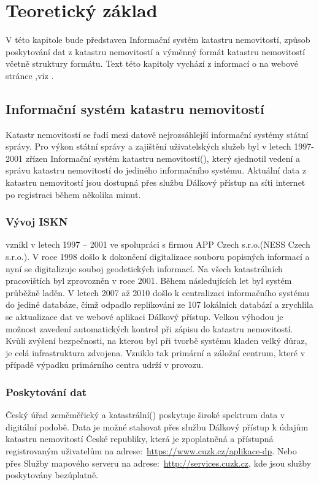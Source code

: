 \chapter{Teoretický základ}
\label{2-teorie}

V této kapitole bude představen Informační systém katastru
nemovitostí, způsob poskytování dat z katastru nemovitostí a výměnný
formát katastru nemovitostí včetně struktury formátu. Text této
kapitoly vychází z informací o  na webové stránce
,viz \cite{iskn}.

\section{Informační systém katastru nemovitostí}
Katastr nemovitostí se řadí mezi datově nejrozsáhlejší informační
systémy státní správy. Pro výkon státní správy a zajištění
uživatelských služeb byl v letech 1997-2001 zřízen Informační systém
katastru nemovitostí(), který sjednotil vedení a správu
katastru nemovitostí do jediného informačního systému. Aktuální data z
katastru nemovitostí jsou dostupná přes službu Dálkový přístup na síti
internet po registraci během několika minut.
\subsection{Vývoj ISKN}
 vznikl v letech 1997 -- 2001 ve spolupráci s firmou APP
Czech s.r.o.(NESS Czech s.r.o.). V roce 1998 došlo k dokončení
digitalizace souboru popisných informací a nyní se digitalizuje souboj
geodetických informací. Na všech katastrálních pracovištích byl
 zprovozněn v roce 2001. Během následujících let byl systém
průběžně laděn. V letech 2007 až 2010 došlo k centralizaci
informačního systému do jediné databáze, čímž odpadlo replikování ze
107 lokálních databází a zrychlila se aktualizace dat ve webové
aplikaci Dálkový přístup. Velkou výhodou  je možnost zavedení
automatických kontrol při zápisu do katastru nemovitostí. Kvůli
zvýšení bezpečnosti, na kterou byl při tvorbě systému kladen velký
důraz, je celá infrastruktura zdvojena. Vzniklo tak primární a záložní
centrum, které v případě výpadku primárního centra udrží  v
provozu.
\subsection{Poskytování dat}
Český úřad zeměměřický a katastrální() poskytuje široké
spektrum data v digitální podobě. Data je možné stahovat přes službu
Dálkový přístup k údajům katastru nemovitostí České republiky, která
je zpoplatněná a přístupná registrovaným uživatelům na
adrese:~\href{https://www.cuzk.cz/aplikace-dp}{https://www.cuzk.cz/aplikace-dp}. Nebo
přes Služby mapového serveru na
adrese:~\href{http://services.cuzk.cz/}{http://services.cuzk.cz}, kde
jsou služby poskytovány bezúplatně.

